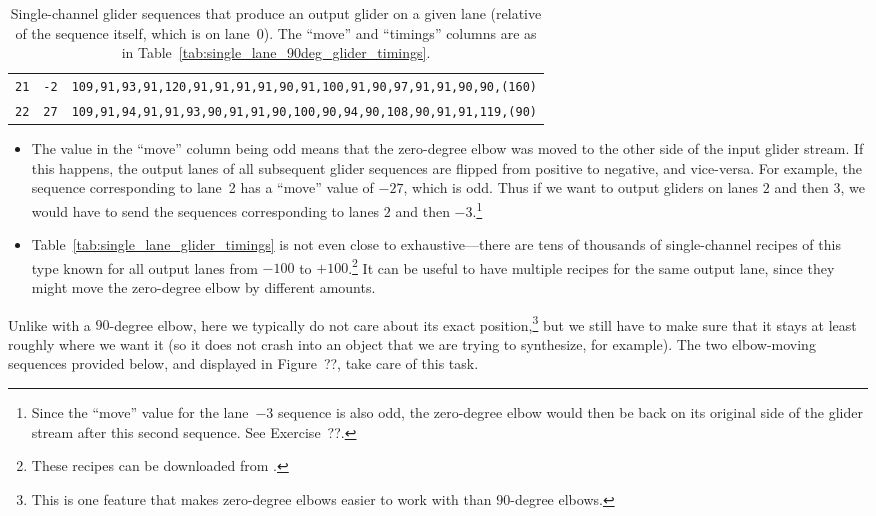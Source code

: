 \begin{table}[!phtb]
\begin{tabular}{@{\hskip 0.31cm}L@{\hskip 0.27cm}r@{\hskip 0.27cm}R@{\hskip 0.34cm}}
		\texttt{21} & \texttt{-2} & \scriptsize\texttt{109,91,93,91,120,91,91,91,91,90,91,100,91,90,97,91,91,90,90,{\color{gray}(160)}} \\
		\texttt{22} & \texttt{27} & \scriptsize\texttt{109,91,94,91,91,93,90,91,91,90,100,90,94,90,108,90,91,91,119,{\color{gray}(90)}} \\\bottomrule
	\end{tabular}
	\caption{Single-channel glider sequences that produce an output glider on a given lane (relative of the sequence itself, which is on lane~0). The ``move'' and ``timings'' columns are as in Table~\ref{tab:single_lane_90deg_glider_timings}.}\label{tab:single_lane_0deg_glider_timings}
\end{table}

\begin{itemize}
	\item The value in the ``move'' column being odd means that the zero-degree elbow was moved to the other side of the input glider stream. If this happens, the output lanes of all subsequent glider sequences are flipped from positive to negative, and vice-versa. For example, the sequence corresponding to lane~2 has a ``move'' value of $-27$, which is odd. Thus if we want to output gliders on lanes $2$ and then $3$, we would have to send the sequences corresponding to lanes $2$ and then $-3$.\footnote{Since the ``move'' value for the lane~$-3$ sequence is also odd, the zero-degree elbow would then be back on its original side of the glider stream after this second sequence. See Exercise~??.}\smallskip
		
	\item Table~\ref{tab:single_lane_glider_timings} is not even close to exhaustive---there are tens of thousands of single-channel recipes of this type known for all output lanes from $-100$ to $+100$.\footnote{These recipes can be downloaded from .} It can be useful to have multiple recipes for the same output lane, since they might move the zero-degree elbow by different amounts.\smallskip
\end{itemize}

Unlike with a $90$-degree elbow, here we typically do not care about its exact position,\footnote{This is one feature that makes zero-degree elbows easier to work with than $90$-degree elbows.} but we still have to make sure that it stays at least roughly where we want it (so it does not crash into an object that we are trying to synthesize, for example). The two elbow-moving sequences provided below, and displayed in Figure~??, take care of this task.

